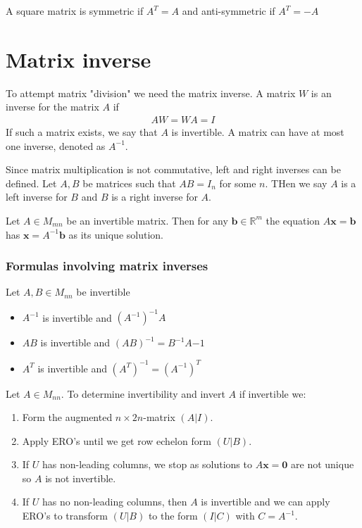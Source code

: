 \documentclass{report}
\renewcommand{\vec}{\mathbf}
\begin{document}
	A square matrix is symmetric if $A^T = A$ and anti-symmetric if $A^T = -A$

	\section{Matrix inverse}

	To attempt matrix "division" we need the matrix inverse. A matrix $W$ is an inverse for the matrix $A$ if
	\begin{align*}
		AW = WA = I
	\end{align*}
	If such a matrix exists, we say that $A$ is invertible. A matrix can have at most one inverse, denoted as $A^{-1}$.

	Since matrix multiplication is not commutative, left and right inverses can be defined. Let $A,B$ be matrices such that $AB = I_n$ for some $n$. THen we say $A$ is a left inverse for $B$ and $B$ is a right inverse for $A$.

	Let $A \in M_{mn}$ be an invertible matrix. Then for any $\vec{b} \in \mathbb{R}^m$ the equation $A\vec{x} = \vec{b}$ has $\vec{x} = A^{-1}\vec{b}$ as its unique solution.

	\subsubsection{Formulas involving matrix inverses}

	Let $A,B \in M_{nn}$ be invertible

	\begin{itemize}
		\item $A^{-1}$ is invertible and $(A^{-1})^{-1} A$
		\item $AB$ is invertible and $(AB)^{-1} = B^{-1}A{-1}$
		\item $A^T$ is invertible and $(A^T)^{-1} = (A^{-1})^T$
	\end{itemize}

	Let $A \in M_{nn}$. To determine invertibility and invert $A$ if invertible we:
	\begin{enumerate}
		\item Form the augmented $n \times 2n$-matrix $(A|I)$.
		\item Apply ERO's until we get row echelon form $(U|B)$.
		\item If $U$ has non-leading columns, we stop as solutions to $A\vec{x} = \vec{0}$ are not unique so $A$ is not invertible.
		\item If $U$ has no non-leading columns, then $A$ is invertible and we can apply ERO's to transform $(U|B)$ to the form $(I|C)$ with $C = A^{-1}$.
	\end{enumerate}
\end{document}
